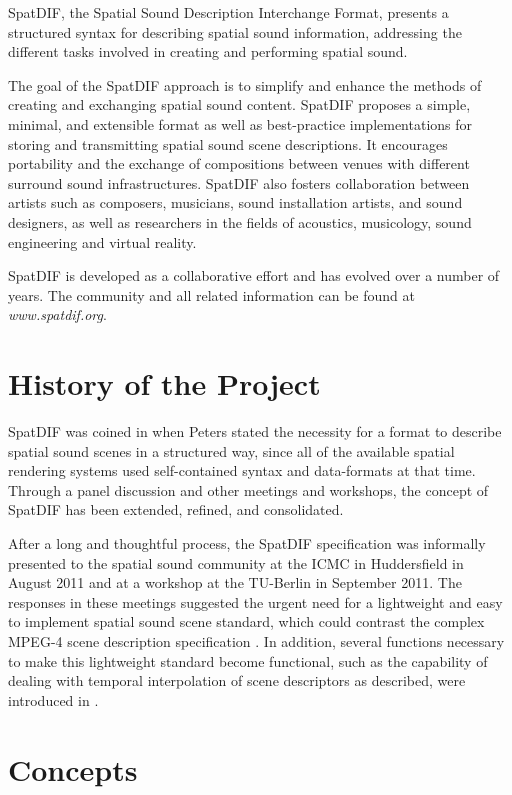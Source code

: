 \documentclass[a4paper]{article}
\begin{document}
SpatDIF, the Spatial Sound Description Interchange Format, presents a structured syntax for describing spatial sound information, addressing the different tasks involved in creating and performing spatial sound.

The goal of the SpatDIF approach is to simplify and enhance the methods of creating and exchanging spatial sound content. 
SpatDIF proposes a simple, minimal, and extensible format as well as best-practice implementations for storing and transmitting spatial sound scene descriptions. 
It encourages portability and the exchange of compositions between venues with different surround sound infrastructures. 
SpatDIF also fosters collaboration between artists such as composers, musicians, sound installation artists, and sound designers, as well as researchers in the fields of acoustics, musicology, sound engineering and virtual reality.

SpatDIF is developed as a collaborative effort and has evolved over a number of years. 
The community and all related information can be found at {\it www.spatdif.org}.

\section{History of the Project} %
SpatDIF was coined in \citeyear{peters_caa07} \cite{peters_caa07} when Peters stated the necessity for a format to describe spatial sound scenes in a structured way, since all of the available spatial rendering systems used self-contained syntax and data-formats at that time. 
Through a panel discussion \cite{2008ICMCpanel, Peters:2008spatdif} and other meetings and workshops, the concept of SpatDIF has been extended, refined, and consolidated. 

After a long and thoughtful process, the SpatDIF specification was informally presented to the spatial sound community at the ICMC in Huddersfield in August 2011 and at a workshop at the TU-Berlin in September 2011.
The responses in these meetings suggested the urgent need for a lightweight and easy to implement spatial sound scene standard, which could contrast the complex MPEG-4 scene description specification \cite{scheirer1999audiobifs}.
In addition, several functions necessary to make this lightweight standard become functional, such as the capability of dealing with temporal interpolation of scene descriptors as described, were introduced in \cite{Peters:2013SpatDifCMJ}.

\section{Concepts}
\end{document}
